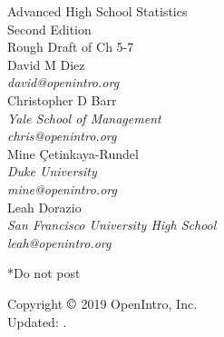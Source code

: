 \begin{center}
{\huge{ Advanced High School Statistics\vspace{10mm} \\  
Second Edition\vspace{10mm}  \\
 Rough Draft of Ch 5-7  \vspace{10mm} }}\\
{David M Diez \\
\small\emph{david@openintro.org} \\
\vspace{6mm}%
Christopher D Barr \\
\small\emph{Yale School of Management} \\
\small\emph{chris@openintro.org} \\
\vspace{6mm}%
Mine \c{C}etinkaya-Rundel \\
\small\emph{Duke University} \\
\small\emph{mine@openintro.org} \\
\vspace{6mm}%
Leah Dorazio \\
\small\emph{San Francisco University High School}\\
\small\emph{leah@openintro.org}}

\end{center}
\vfil{}
{\huge{*Do not post}\vspace{10mm} }



\noindent Copyright $\copyright$ 2019 OpenIntro, Inc.  \\
Updated: \versiondate. \\


